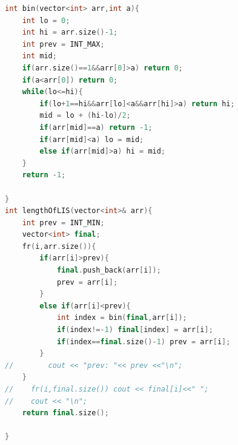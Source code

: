 \documentclass[11pt]{scrartcl}
\begin{document}
\begin{lstlisting}[language = C++]
    int bin(vector<int> arr,int a){
    int lo = 0;
    int hi = arr.size()-1;
    int prev = INT_MAX;
    int mid;
    if(arr.size()==1&&arr[0]>a) return 0;
    if(a<arr[0]) return 0;
    while(lo<=hi){
        if(lo+1==hi&&arr[lo]<a&&arr[hi]>a) return hi;
        mid = lo + (hi-lo)/2;
        if(arr[mid]==a) return -1;
        if(arr[mid]<a) lo = mid;
        else if(arr[mid]>a) hi = mid;
    }
    return -1;

}
int lengthOfLIS(vector<int>& arr){
    int prev = INT_MIN;
    vector<int> final;
    fr(i,arr.size()){
        if(arr[i]>prev){
            final.push_back(arr[i]);
            prev = arr[i];
        }
        else if(arr[i]<prev){
            int index = bin(final,arr[i]);
            if(index!=-1) final[index] = arr[i];
            if(index==final.size()-1) prev = arr[i];
        }
//        cout << "prev: "<< prev <<"\n";
    }
//    fr(i,final.size()) cout << final[i]<<" ";
//    cout << "\n";
    return final.size();

}
\end{lstlisting}
\end{document}
